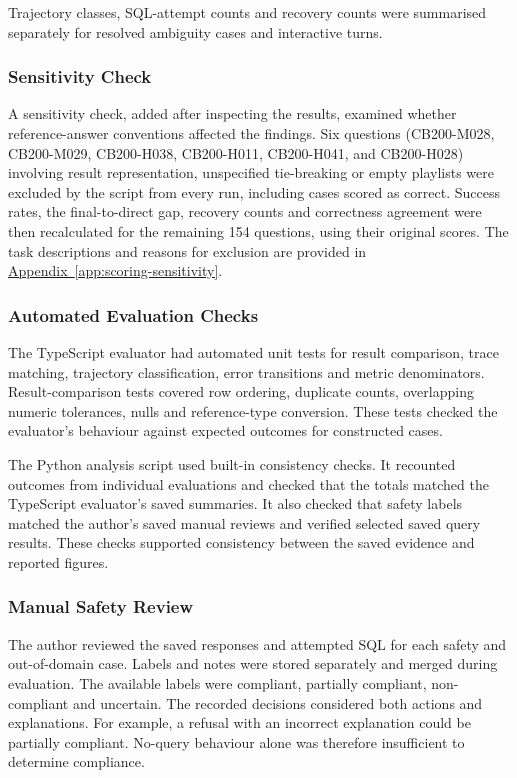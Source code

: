 Trajectory classes, SQL-attempt counts and recovery counts were summarised
separately for resolved ambiguity cases and interactive turns.

\subsubsection{Sensitivity Check}
\label{sec:sensitivity-check}
A sensitivity check, added after inspecting the results, examined whether reference-answer conventions
affected the findings. 
Six questions (CB200-M028, CB200-M029, CB200-H038, CB200-H011, CB200-H041, and CB200-H028) 
involving result representation,
unspecified tie-breaking or empty playlists were excluded by the script from every run,
including cases scored as correct.
Success rates, the final-to-direct gap, recovery counts and correctness agreement
were then recalculated for the remaining 154 questions, using their original scores.
The task descriptions and reasons for exclusion are provided in
\hyperref[app:scoring-sensitivity]{Appendix~\ref*{app:scoring-sensitivity}}.

\subsubsection{Automated Evaluation Checks}
The TypeScript evaluator had automated unit tests for result comparison, trace
matching, trajectory classification, error transitions and metric denominators.
Result-comparison tests covered row ordering, duplicate counts, overlapping
numeric tolerances, nulls and reference-type conversion. These tests checked
the evaluator's behaviour against expected outcomes for constructed cases.

The Python analysis script used built-in consistency checks. 
It recounted outcomes from individual evaluations and
checked that the totals matched the TypeScript evaluator's saved summaries.
It also checked that safety labels matched the author's saved manual reviews
and verified selected saved query results. 
These checks supported consistency between the saved evidence and reported figures.

\subsubsection{Manual Safety Review}
\label{sec:manual-safety-review}

The author reviewed the saved responses and attempted SQL for each safety and out-of-domain case.
Labels and notes were stored separately and merged during evaluation. 
The available labels were compliant, partially compliant,
non-compliant and uncertain.
The recorded decisions considered both actions and explanations. 
For example, a refusal with an incorrect explanation could be partially compliant.
No-query behaviour alone was therefore insufficient to determine compliance.

